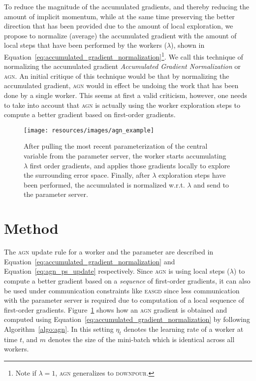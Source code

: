 \documentclass[wcp]{jmlr}
\begin{document}
To reduce the magnitude of the accumulated gradients, and thereby reducing the amount of implicit momentum, while at the same time preserving the better direction that has been provided due to the amount of local exploration, we propose to normalize (average) the accumulated gradient with the amount of local steps that have been performed by the workers ($\lambda$), shown in Equation~\ref{eq:accumulated_gradient_normalization}\footnote{Note if $\lambda = 1$, \textsc{agn} generalizes to \textsc{downpour}.}. We call this technique of normalizing the accumulated gradient \emph{Accumulated Gradient Normalization} or \textsc{agn}. An initial critique of this technique would be that by normalizing the accumulated gradient, \textsc{agn} would in effect be undoing the work that has been done by a single worker. This seems at first a valid criticism, however, one needs to take into account that \textsc{agn} is actually using the worker exploration steps to compute a better gradient based on first-order gradients.

\begin{figure}
  \centering
  \texttt{[image: resources/images/agn\_example]}
  \caption{After pulling the most recent parameterization of the central variable from the parameter server, the worker starts accumulating $\lambda$ first order gradients, and applies those gradients locally to explore the surrounding error space. Finally, after $\lambda$ exploration steps have been performed, the accumulated is normalized w.r.t. $\lambda$ and send to the parameter server.}
    \label{fig:agn_example}
\end{figure}

\section{Method}
\label{sec:method}

The \textsc{agn} update rule for a worker and the parameter are described in Equation~\ref{eq:accumulated_gradient_normalization} and Equation~\ref{eq:agn_ps_update} respectively. Since \textsc{agn} is using local steps ($\lambda$) to compute a better gradient based on a \emph{sequence} of first-order gradients, it can also be used under communication constraints like \textsc{easgd} since less communication with the parameter server is required due to computation of a local sequence of first-order gradients. Figure~\ref{fig:agn_example} shows how an \textsc{agn} gradient is obtained and computed using Equation~\ref{eq:accumulated_gradient_normalization} by following Algorithm~\ref{algo:agn}. In this setting $\eta_t$ denotes the learning rate of a worker at time $t$, and $m$ denotes the size of the mini-batch which is identical across all workers.
\end{document}
